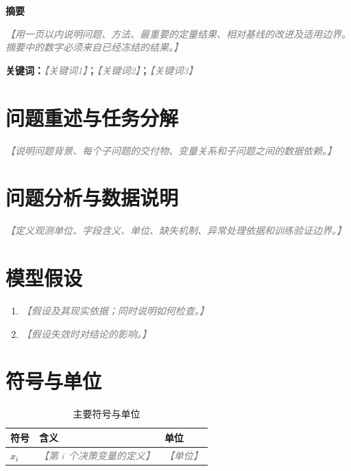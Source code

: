 \documentclass[UTF8,zihao=-4,fontset=fandol,a4paper]{ctexart}
\title{\bfseries\zihao{3} \placeholder{论文题目}}
\date{}
\newenvironment{cumcmabstract}
  {\begin{center}\bfseries\zihao{4} 摘\quad 要\end{center}\noindent}
  {\par}
\newcommand{\keywords}[1]{\par\vspace{0.8ex}\noindent\textbf{关键词：}#1}
\newcommand{\placeholder}[1]{\textcolor{gray}{\textit{【#1】}}}
\begin{document}
\maketitle
\thispagestyle{fancy}
\vspace{-3em}

\begin{cumcmabstract}
\placeholder{用一页以内说明问题、方法、最重要的定量结果、相对基线的改进及适用边界。摘要中的数字必须来自已经冻结的结果。}
\keywords{\placeholder{关键词1}；\placeholder{关键词2}；\placeholder{关键词3}}
\end{cumcmabstract}

\newpage

\section{问题重述与任务分解}

\placeholder{说明问题背景、每个子问题的交付物、变量关系和子问题之间的数据依赖。}

\section{问题分析与数据说明}

\placeholder{定义观测单位、字段含义、单位、缺失机制、异常处理依据和训练验证边界。}

\section{模型假设}

\begin{enumerate}
  \item \placeholder{假设及其现实依据；同时说明如何检查。}
  \item \placeholder{假设失效时对结论的影响。}
\end{enumerate}

\section{符号与单位}

\begin{table}[H]
  \centering
  \caption{主要符号与单位}
  \begin{tabularx}{0.88\textwidth}{>{\centering\arraybackslash}p{} X >{\centering\arraybackslash}p{}}
    \toprule
    符号 & 含义 & 单位 \\
    \midrule
    $x_i$ & \placeholder{第 $i$ 个决策变量的定义} & \placeholder{单位} \\
    \bottomrule
  \end{tabularx}
  \label{tab:symbols}
\end{table}
\end{document}
